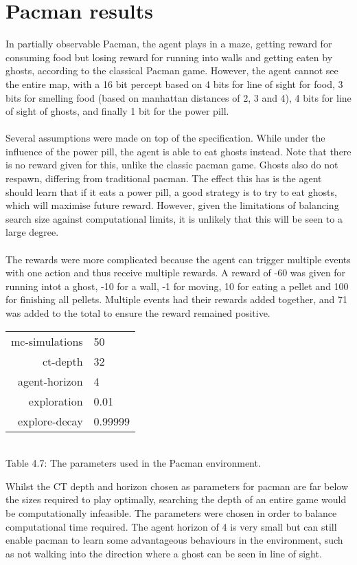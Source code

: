 \documentclass[pdftex,twoside,a4paper]{report}
\begin{document}
\section{Pacman results}
In partially observable Pacman, the agent plays in a maze, getting reward for consuming food but losing reward for running into walls and getting eaten by ghosts, according to the classical Pacman game. However, the agent cannot see the entire map, with a 16 bit percept based on 4 bits for line of sight for food, 3  bits for smelling food (based on manhattan distances of 2, 3 and 4), 4 bits for line of sight of ghosts, and finally 1 bit for the power pill.\\\\
Several assumptions were made on top of the specification.  While under the influence of the power pill, the agent is able to eat ghosts instead. Note that there is no reward given for this, unlike the classic pacman game. Ghosts also do not respawn, differing from traditional pacman. The effect this has is the agent should learn that if it eats a power pill, a good strategy is to try to eat ghosts, which will maximise future reward. However, given the limitations of balancing search size against computational limits, it is unlikely that this will be seen to a large degree.\\\\
The rewards were more complicated because the agent can trigger multiple events with one action and thus receive multiple rewards. A reward of -60 was given for running intot a ghost, -10 for a wall, -1 for moving, 10 for eating a pellet and 100 for finishing all pellets. Multiple events had their rewards added together, and 71 was added to the total to ensure the reward remained positive.
\begin{center}
\begin{tabular}{| r | l | }
\hline
mc-simulations & 50\\
ct-depth & 32\\
agent-horizon & 4\\
exploration & 0.01\\
explore-decay & 0.99999\\
\hline
\end{tabular}\\
\vspace{0.5mm}
Table 4.7: The parameters used in the Pacman environment.
\end{center}
Whilst the CT depth and horizon chosen as parameters for pacman are far below the sizes required to play optimally, searching the depth of an entire game would be computationally infeasible. The parameters were chosen in order to balance computational time required. The agent horizon of 4 is very small but can still enable pacman to learn some advantageous behaviours in the environment, such as not walking into the direction where a ghost can be seen in line of sight.
\end{document}
